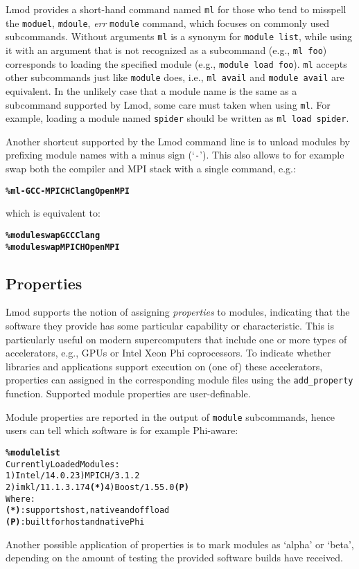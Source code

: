 Lmod provides a short-hand command named \texttt{\small ml} for those who tend to
misspell the \texttt{\small moduel}, \texttt{\small mdoule}, \emph{err}
\texttt{\small module} command, which focuses on
commonly used subcommands. Without arguments \texttt{\small ml} is a synonym for
\texttt{\small module list}, while using it with an argument that is not
recognized as a subcommand (e.g., \texttt{\small ml foo}) corresponds to loading
the specified module (e.g., \texttt{\small module load foo}).
\texttt{\small ml} accepts other subcommands just like \texttt{\small module} does,
i.e., \texttt{\small ml avail} and \texttt{\small module avail} are equivalent.
In the unlikely case that a module name is the same as a subcommand supported by Lmod, 
some care must taken when using \texttt{\small ml}. For example, loading a module
named \texttt{\small spider} should be written as \texttt{\small ml load spider}.

Another shortcut supported by the Lmod command line is to unload modules by
prefixing module names with a minus sign (`\texttt{\small-}'). This also allows to
for example swap both the compiler and MPI stack with a single command, e.g.:
{\small
  \begin{alltt}
      \textbf{\% ml -GCC -MPICH Clang OpenMPI}\
  \end{alltt}
}
\noindent
which is equivalent to:{\small
  \begin{alltt}
      \textbf{\% module swap GCC Clang}
      \textbf{\% module swap MPICH OpenMPI}\end{alltt}}

\subsection{Properties}

Lmod supports the notion of assigning \emph{properties} to modules,
indicating that the software they provide has some particular capability or
characteristic. This is particularly useful on modern supercomputers that include
one or more types of accelerators, e.g., GPUs or Intel Xeon Phi coprocessors.
To indicate whether libraries and applications support execution on (one of) these
accelerators, properties can assigned in the corresponding module files
using the \texttt{\small add\_property} function. Supported module
properties are user-definable.

Module properties are reported in the output of \texttt{\small module} subcommands,
hence users can tell which software is for example Phi-aware:
{\small
\begin{alltt}
  \textbf{\% module list}
  Currently Loaded Modules:
    1) Intel/14.0.2        3) MPICH/3.1.2
    2) imkl/11.1.3.174 \textbf{(*)} 4) Boost/1.55.0 \textbf{(P)}
  Where:
   \textbf{(*)}:  supports host, native and offload
   \textbf{(P)}:  built for host and native Phi
\end{alltt}
}
\noindent Another possible application of properties is to mark modules as `alpha'
or `beta', depending on the amount of testing the provided software builds have
received.


